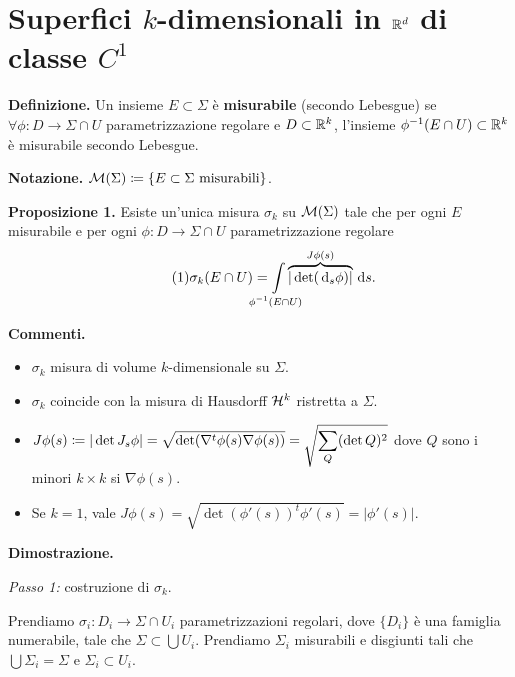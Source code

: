\section{Superfici $k$-dimensionali in $\mathbb R^d$ di classe $C^1$}

\textbf{Definizione.} Un insieme $E \subset \Sigma$ è \textbf{misurabile} (secondo Lebesgue) se $\forall \phi \colon D \to \Sigma \cap U$ parametrizzazione regolare e $D \subset \mathbb R^k$, l'insieme $\phi^{-1}(E \cap U) \subset \mathbb R^k$ è misurabile secondo Lebesgue.

\textbf{Notazione.} $\mathcal{M}(\Sigma) \coloneqq  \{ E \subset \Sigma \text{ misurabili} \}$.

\textbf{Proposizione 1.} Esiste un'unica misura $\sigma_k$ su $\mathcal{M}(\Sigma)$ tale che per ogni $E$ misurabile e per ogni $\phi \colon D \to \Sigma \cap U$ parametrizzazione regolare
%
\begin{equation}
	\label{eq:16dic_formula1} \tag{1}
	\sigma_k (E \cap U) = \int\limits_{\mathclap{\phi^{-1}(E \cap U)}} \overbrace{|\det (\dd_s \phi)|}^{J\phi (s)} \dd s.
\end{equation}

\textbf{Commenti.} 
\begin{itemize}

	\item $\sigma_k$ misura di volume $k$-dimensionale su $\Sigma$.

	\item $\sigma_k$ coincide con la misura di Hausdorff $\mathcal{H}^k$ ristretta a $\Sigma$.

	\item $\displaystyle J\phi (s) \coloneqq |\det J_s \phi| = \sqrt{\det (\nabla^t \phi(s) \nabla \phi(s))} = \sqrt{\sum_Q (\det Q)^2} $ dove $Q$ sono i minori $k \times k$ si $\nabla \phi(s)$.

	\item Se $k = 1$, vale $J\phi(s) = \sqrt{\det(\phi'(s))^t \phi'(s)} = |\phi'(s)| $.

\end{itemize}


\textbf{Dimostrazione.} 

\textit{Passo 1:} costruzione di $\sigma_k$.

Prendiamo $\sigma_i \colon  D_i \to \Sigma \cap U_i$ parametrizzazioni regolari, dove $\{D_i\}$ è una famiglia numerabile, tale che $\Sigma \subset \bigcup U_i$.
Prendiamo $\Sigma_i$ misurabili e disgiunti tali che $\bigcup \Sigma_i = \Sigma$ e $\Sigma_i \subset U_i$.

